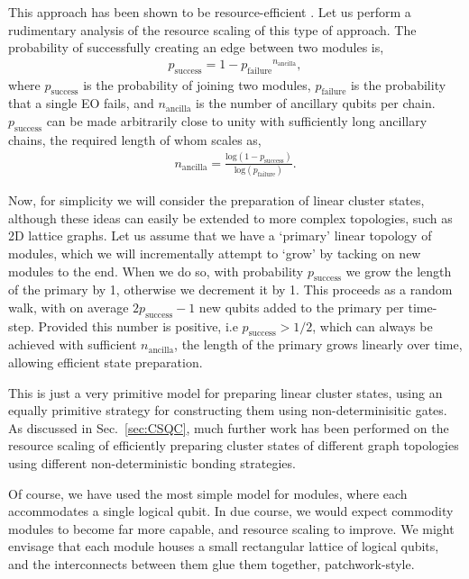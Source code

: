 \documentclass[aps,rmp,twocolumn,amsmath,amssymb,nofootinbib,superscriptaddress]{revtex4}
\begin{document}
This approach has been shown to be resource-efficient \cite{nielsenoptcs}. Let us perform a rudimentary analysis of the resource scaling of this type of approach. The probability of successfully creating an edge between two modules is,
\begin{align}
p_\mathrm{success} = 1 - {p_\mathrm{failure}}^{n_\mathrm{ancilla}},
\end{align}
where $p_\mathrm{success}$ is the probability of joining two modules, $p_\mathrm{failure}$ is the probability that a single EO fails, and $n_\mathrm{ancilla}$ is the number of ancillary qubits per chain. $p_\mathrm{success}$ can be made arbitrarily close to unity with sufficiently long ancillary chains, the required length of whom scales as,
\begin{align}
n_\mathrm{ancilla} = \frac{\mathrm{log}(1-p_\mathrm{success})}{\mathrm{log}(p_\mathrm{failure})}.
\end{align}

Now, for simplicity we will consider the preparation of linear cluster states, although these ideas can easily be extended to more complex topologies, such as 2D lattice graphs. Let us assume that we have a `primary' linear topology of modules, which we will incrementally attempt to `grow' by tacking on new modules to the end. When we do so, with probability $p_\mathrm{success}$ we grow the length of the primary by 1, otherwise we decrement it by 1. This proceeds as a random walk, with on average \mbox{$2p_\mathrm{success}-1$} new qubits added to the primary per time-step. Provided this number is positive, i.e \mbox{$p_\mathrm{success}>1/2$}, which can always be achieved with sufficient $n_\mathrm{ancilla}$, the length of the primary grows linearly over time, allowing efficient state preparation.

This is just a very primitive model for preparing linear cluster states, using an equally primitive strategy for constructing them using non-determinisitic gates. As discussed in Sec.~\ref{sec:CSQC}, much further work has been performed on the resource scaling of efficiently preparing cluster states of different graph topologies using different non-deterministic bonding strategies.

Of course, we have used the most simple model for modules, where each accommodates a single logical qubit. In due course, we would expect commodity modules to become far more capable, and resource scaling to improve. We might envisage that each module houses a small rectangular lattice of logical qubits, and the interconnects between them glue them together, patchwork-style.
\end{document}
